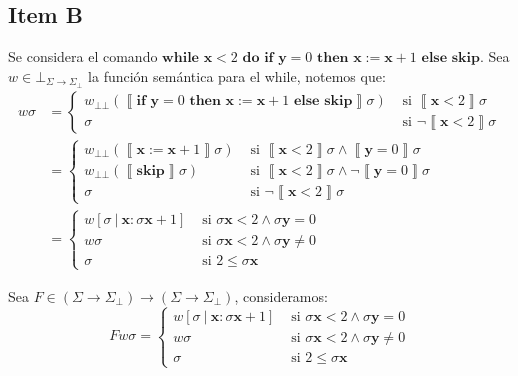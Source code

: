 \documentclass{article}
\newcommand{\sem}[1]{\left\llbracket #1\right\rrbracket}
\newcommand{\x}{\textbf{x}}
\newcommand{\y}{\textbf{y}}
\newcommand{\cdom}{\Sigma \to \Sigma_\bot}
\newcommand{\cfbot}{\bot_{\cdom}}
\newcommand{\bbot}{\bot\!\!\!\bot}
\newcommand{\cskip}{\textbf{skip}}
\newcommand{\cif}[3]{\textbf{if }#1\textbf{ then }#2\textbf{ else }#3}
\newcommand{\cwhile}[2]{\textbf{while }#1\textbf{ do }#2}
\begin{document}
\subsection*{Item B}
Se considera el comando $\cwhile{\x < 2}{\cif{\y = 0}{\x := \x + 1}{\cskip}}$.
Sea $w \in \cfbot$ la función semántica para el while, notemos que:
\begin{equation*}
  \begin{aligned}
    w \sigma &= \begin{cases}
      w_{\bbot} (\sem{\cif{\y = 0}{\x := \x + 1}{\cskip}} \sigma) &\text{ si }\sem{\x < 2}\sigma \\ 
      \sigma &\text{ si }\neg\sem{\x < 2}\sigma
    \end{cases} \\ 
             &= \begin{cases}
               w_{\bbot} (\sem{\x := \x + 1} \sigma) & \text{ si } \sem{\x < 2}\sigma \land \sem{\y = 0}\sigma \\ 
               w_{\bbot} (\sem{\cskip} \sigma) &\text{ si }\sem{\x < 2}\sigma \land \neg\sem{\y = 0}\sigma \\ 
               \sigma &\text{ si } \neg\sem{\x < 2}\sigma
             \end{cases} \\ 
             &= \begin{cases}
               w [\sigma\ |\ \x : \sigma\x+1] &\text{ si } \sigma\x < 2 \land \sigma\y = 0 \\ 
               w \sigma &\text{ si } \sigma\x < 2 \land \sigma\y \neq 0 \\ 
               \sigma &\text{ si } 2 \leq \sigma\x
             \end{cases}
  \end{aligned}
\end{equation*}

Sea $F \in (\cdom) \to (\cdom)$, consideramos:
\begin{equation*}
  F w \sigma = \begin{cases}
    w [\sigma\ |\ \x : \sigma\x+1] &\text{ si }\sigma\x < 2 \land \sigma\y = 0 \\ 
    w \sigma &\text{ si }\sigma\x < 2 \land \sigma\y \neq 0 \\ 
    \sigma &\text{ si } 2 \leq \sigma\x
  \end{cases}
\end{equation*}
\end{document}
